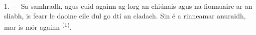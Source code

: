 %
%
%
%

\VUsaut{4.0mm}
\VUsaut{3.0mm}
\VUsaut{3.0mm}

1. --- Sa samhradh, agus cuid againn ag lorg an chiúnais agus na fionnuaire ar an
sliabh, is fearr le daoine eile dul go dtí an cladach. Sin é a rinneamar anuraidh,
mar is mór againn  \textsuperscript{(1)}.


